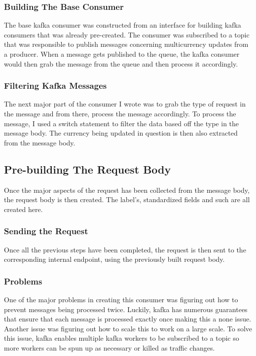 \subsubsection{Building The Base Consumer}
The base kafka consumer was constructed from an interface for building kafka consumers that was already pre-created. The consumer was subscribed to a topic that was responsible to publish messages concerning multicurrency updates from a producer. When a message gets published to the queue, the kafka consumer would then grab the message from the queue and then process it accordingly. 

\subsubsection{Filtering Kafka Messages}
The next major part of the consumer I wrote was to grab the type of request in the message and from there, process the message accordingly. To process the message, I used a switch statement to filter the data based off the type in the message body. The currency being updated in question is then also extracted from the message body.

\subsection{Pre-building The Request Body}
Once the major aspects of the request has been collected from the message body, the request body is then created. The label's, standardized fields and such are all created here.

\subsubsection{Sending the Request}
Once all the previous steps have been completed, the request is then sent to the corresponding internal endpoint, using the previously built request body. 

\subsubsection{Problems}
One of the major problems in creating this consumer was figuring out how to prevent messages being processed twice. Luckily, kafka has numerous guarantees that ensure that each message is processed exactly once making this a none issue. Another issue was figuring out how to scale this to work on a large scale. To solve this issue, kafka enables multiple kafka workers to be subscribed to a topic so more workers can be spun up as necessary or killed as traffic changes. 

